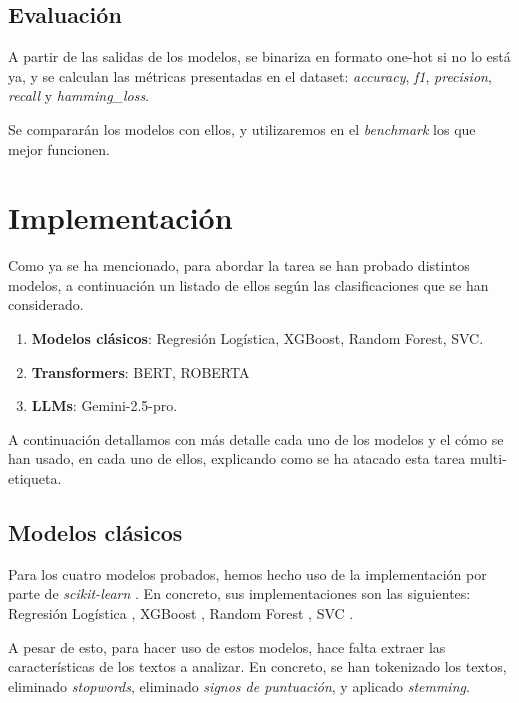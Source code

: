 \documentclass[11pt,spanish,listoffigures,listoftables]{tfgetsinf}
\begin{document}
\section{Evaluación}
A partir de las salidas de los modelos, se binariza en formato one-hot si no lo está ya, y se calculan las métricas presentadas en el dataset: \textit{accuracy}, \textit{f1}, \textit{precision}, \textit{recall} y \textit{hamming\_loss}.

Se compararán los modelos con ellos, y utilizaremos en el \textit{benchmark} los que mejor funcionen. 

\chapter{Implementación}
Como ya se ha mencionado, para abordar la tarea se han probado distintos modelos, a continuación un listado de ellos según las clasificaciones que se han considerado.

\begin{enumerate}
    \item \textbf{Modelos clásicos}: Regresión Logística, XGBoost, Random Forest, SVC.
    \item \textbf{Transformers}: BERT, ROBERTA
    \item \textbf{LLMs}: Gemini-2.5-pro.
\end{enumerate}

A continuación detallamos con más detalle cada uno de los modelos y el cómo se han usado, en cada uno de ellos, explicando como se ha atacado esta tarea multi-etiqueta.

\section{Modelos clásicos}
Para los cuatro modelos probados, hemos hecho uso de la implementación por parte de \textit{scikit-learn} \cite{scikit-learn-doc-2025}. En concreto, sus implementaciones son las siguientes: Regresión Logística \cite{logisticregression-sklearn-2025}, XGBoost \cite{xgboost-sklearn-estimator-2025}, Random Forest \cite{randomforestclassifier-sklearn-2025}, SVC \cite{svc-sklearn-2025}.

A pesar de esto, para hacer uso de estos modelos, hace falta extraer las características de los textos a analizar. En concreto, se han tokenizado los textos, eliminado \textit{stopwords}, eliminado \textit{signos de puntuación}, y aplicado \textit{stemming}. 
\end{document}

